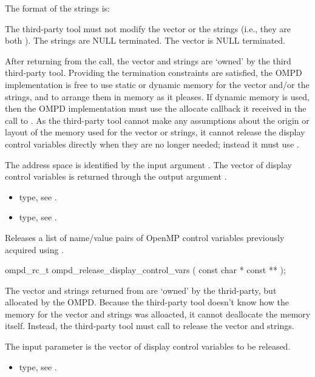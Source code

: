 The format of the strings is:
\begin{center}
\end{center}

The third-party tool must not modify the vector or the strings
(i.e., they are both ).
The strings are NULL terminated.
The vector is NULL terminated.

After returning from the call, the vector and strings are `owned'
by the third third-party tool.
Providing the termination constraints are satisfied, the OMPD
implementation is free to use static or dynamic memory for the
vector and/or the strings, and to arrange them in memory
as it pleases.
If dynamic memory is used, then the OMPD implementation must use
the allocate callback it received in the call to .
As the third-party tool cannot make any assumptions about the origin or
layout of the memory used for the vector or strings, it cannot release
the display control variables directly when they are no longer
needed; instead it must use .

\argdesc
The address space is identified by the input argument .
The vector of display control variables is returned through
the output argument .

\crossreferences
\begin{itemize}
	\item {} type, see .
	\item {} type, see .
\end{itemize}


\label{subsubsubsec:ompd_release_display_control_vars}
\summary

Releases a list of name/value pairs of OpenMP control variables
previously acquired using .
\format
\begin{cspecific}
\begin{ompSyntax}
ompd_rc_t ompd_release_display_control_vars (
  const char * const **
);
\end{ompSyntax}
\end{cspecific}

\descr
The vector and strings returned from 
are `owned' by the thrid-party, but allocated by the OMPD.
Because the third-party tool doesn't know how the memory for the vector
and strings was alloacted, it cannot deallocate the memory itself.
Instead, the third-party tool must call
 to release the vector
and strings.

\argdesc
The input parameter  is the vector of display control variables to be released.

\crossreferences
\begin{itemize}
	\item {} type, see .
\end{itemize}
